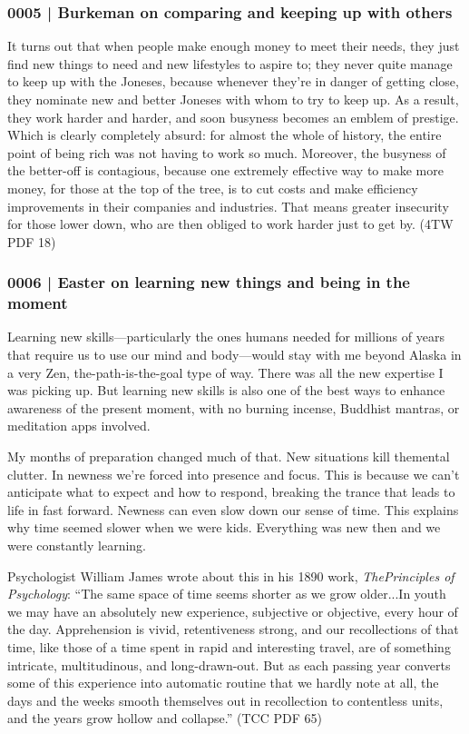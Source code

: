 		\subsubsection{0005 | Burkeman on comparing and keeping up with others}
			\label{GM-LIFE-TIME-0005}
			
			It turns out that when people make enough money to meet their needs, they just find new things to need and new lifestyles to aspire to; they never quite manage to keep up with the Joneses, because whenever they're in danger of getting close, they nominate new and better Joneses with whom to try to keep up. As a result, they work harder and harder, and soon busyness becomes an emblem of prestige. Which is clearly completely absurd: for almost the whole of history, the entire point of being rich was not having to work so much. Moreover, the busyness of the better-off is contagious, because one extremely effective way to make more money, for those at the top of the tree, is to cut costs and make efficiency improvements in their companies and industries. That means greater insecurity for those lower down, who are then obliged to work harder just to get by. (4TW PDF 18)
			
		\subsubsection{0006 | Easter on learning new things and being in the moment}
			\label{GM-LIFE-TIME-0006}
			
			Learning new skills---particularly the ones humans needed for millions of years that require us to use our mind and body---would stay with me beyond Alaska in a very Zen, the-path-is-the-goal type of way. There was all the new expertise I was picking up. But learning new skills is also one of the best ways to enhance awareness of the present moment, with no burning incense, Buddhist mantras, or meditation apps involved.
			
			My months of preparation changed much of that. New situations kill themental clutter. In newness we're forced into presence and focus. This is because we can't anticipate what to expect and how to respond, breaking the trance that leads to life in fast forward. Newness can even slow down our sense of time. This explains why time seemed slower when we were kids. Everything was new then and we were constantly learning.

			Psychologist William James wrote about this in his 1890 work, \textit{ThePrinciples of Psychology}: ``The same space of time seems shorter as we grow older...In youth we may have an absolutely new experience, subjective or objective, every hour of the day. Apprehension is vivid, retentiveness strong, and our recollections of that time, like those of a time spent in rapid and interesting travel, are of something intricate, multitudinous, and long-drawn-out. But as each passing year converts some of this experience into automatic routine that we hardly note at all, the days and the weeks smooth themselves out in recollection to contentless units, and the years grow hollow and collapse.'' (TCC PDF 65)
		

